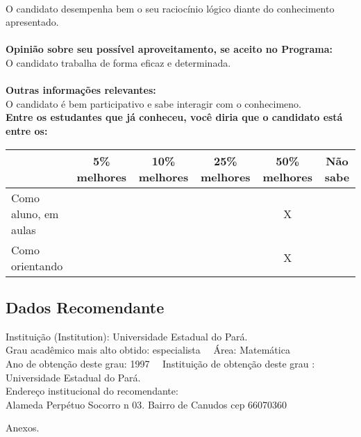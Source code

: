 \documentclass[11pt]{article}
\begin{document}
\\O candidato desempenha bem o seu raciocínio lógico diante do conhecimento apresentado.\\
\\
\textbf{Opinião sobre seu possível aproveitamento, se aceito no Programa:}
\\O candidato trabalha de forma eficaz e determinada.\\ 
\\
\textbf{Outras informações relevantes:} \\O candidato é bem participativo e sabe interagir com o conhecimeno.
\\[0.3cm]
\textbf{Entre os estudantes que já conheceu, você diria que o candidato está entre os:}
\\
\begin{tabular}{|l|c|c|c|c|c|}
\hline
 & 5\% melhores & 10\% melhores & 25\% melhores & 50\% melhores & Não sabe \\
\hline
Como aluno, em aulas &  &  &  & X & \\
\hline
Como orientando &  &  &  & X & \\
\hline
\end{tabular}
\subsection*{Dados Recomendante} 
	Instituição (Institution): Universidade Estadual do Pará.
\\ 
	Grau acadêmico mais alto obtido: especialista
	\ \ Área: Matemática
	\\
	Ano de obtenção deste grau: 1997
	\ \ 
	Instituição de obtenção deste grau : Universidade Estadual do Pará.
	\\ 
	Endereço institucional do recomendante: \\ Alameda Perpétuo Socorro n 03. Bairro de Canudos cep 66070360 
\begin{center}
Anexos.
\end{center}
\end{document}
